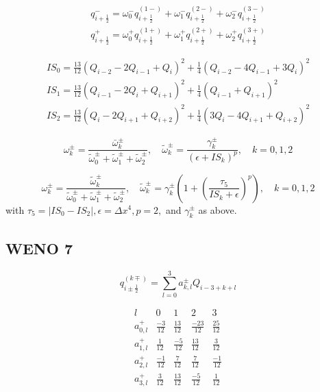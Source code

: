 \begin{equation}
\begin{array}{l}
q_{i+\frac{1}{2}}^{-}=\omega_{0}^{-} q_{i+\frac{1}{2}}^{(1-)}+\omega_{1}^{-} q_{i+\frac{1}{2}}^{(2-)}+\omega_{2}^{-} q_{i+\frac{1}{2}}^{(3-)} \\
q_{i+\frac{1}{2}}^{+}=\omega_{0}^{+} q_{i+\frac{1}{2}}^{(1+)}+\omega_{1}^{+} q_{i+\frac{1}{2}}^{(2+)}+\omega_{2}^{+} q_{i+\frac{1}{2}}^{(3+)}
\end{array}
\end{equation}

\begin{equation}
\begin{array}{l}
I S_{0}=\frac{13}{12}\left(Q_{i-2}-2 Q_{i-1}+Q_{i}\right)^{2}+\frac{1}{4}\left(Q_{i-2}-4 Q_{i-1}+3 Q_{i}\right)^{2} \\
I S_{1}=\frac{13}{12}\left(Q_{i-1}-2 Q_{i}+Q_{i+1}\right)^{2}+\frac{1}{4}\left(Q_{i-1}+Q_{i+1}\right)^{2} \\
I S_{2}=\frac{13}{12}\left(Q_{i}-2 Q_{i+1}+Q_{i+2}\right)^{2}+\frac{1}{4}\left(3 Q_{i}-4 Q_{i+1}+Q_{i+2}\right)^{2}
\end{array}
\end{equation}

\begin{equation}
\omega_{k}^{\pm}=\frac{\bar{\omega}_{k}^{\pm}}{\tilde{\omega}_{0}^{\pm}+\tilde{\omega}_{1}^{\pm}+\tilde{\omega}_{2}^{\pm}}, \quad \tilde{\omega}_{k}^{\pm}=\frac{\gamma_{k}^{\pm}}{\left(\epsilon+I S_{k}\right)^{p}}, \quad k=0,1,2
\end{equation}


$$
\omega_{k}^{\pm}=\frac{\tilde{\omega}_{k}^{\pm}}{\tilde{\omega}_{0}^{\pm}+\tilde{\omega}_{1}^{\pm}+\tilde{\omega}_{2}^{\pm}}, \quad \tilde{\omega}_{k}^{\pm}=\gamma_{k}^{\pm}\left(1+\left(\frac{\tau_{5}}{I S_{k}+\epsilon}\right)^{p}\right), \quad k=0,1,2
$$
with $\tau_{5}=\left|I S_{0}-I S_{2}\right|, \epsilon=\Delta x^{4}, p=2,$ and $\gamma_{k}^{\pm}$ as above.

\subsection{WENO 7}

\begin{equation}
q_{i \pm \frac{1}{2}}^{(k \mp)}=\sum_{l=0}^{3} a_{k, l}^{\pm} Q_{i-3+k+l}
\end{equation}

\begin{equation}
\begin{array}{c||cccc}
l & 0 & 1 & 2 & 3 \\
\hline a_{0, l}^{+} & \frac{-3}{12} & \frac{13}{12} & \frac{-23}{12} & \frac{25}{12} \\
a_{1, l}^{+} & \frac{1}{12} & \frac{-5}{12} & \frac{13}{12} & \frac{3}{12} \\
a_{2, l}^{+} & \frac{-1}{12} & \frac{7}{12} & \frac{7}{12} & \frac{-1}{12} \\
a_{3, l}^{+} & \frac{3}{12} & \frac{13}{12} & \frac{-5}{12} & \frac{1}{12}
\end{array}
\end{equation}

